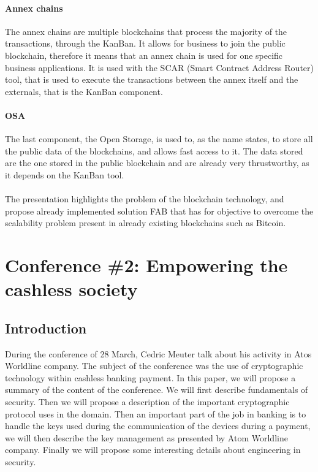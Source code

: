 \documentclass[11pt,a4paper]{article}
\begin{document}
\paragraph{Annex chains}

The annex chains are multiple blockchains that process the majority
of the transactions, through the KanBan. It allows for
business to join the public blockchain, therefore it means that
an annex chain is used for one specific business applications.
It is used with the SCAR (Smart Contract Address Router) tool, that is
used to execute the transactions between the annex itself
and the externals, that is the KanBan component.

\paragraph{OSA}

The last component, the Open Storage, is used to, as the name states, to
store all the public data of the blockchains, and allows fast access
to it. The data stored are the one stored in the public blockchain
and are already very thrustworthy, as it depends on the KanBan tool.

\paragraph{}

The presentation highlights the problem of the blockchain technology,
and propose already implemented solution FAB that has for objective
to overcome the scalability problem present in already existing blockchains
such as Bitcoin.

\newpage

\section{Conference \#2: Empowering the cashless society}

\subsection{Introduction}

During the conference of 28 March, Cedric Meuter
talk about his activity in Atos Worldline company.
The subject of the conference was the use of
cryptographic technology within cashless banking payment.
In this paper, we will propose a summary of the content of the
conference. We will first describe fundamentals of security.
Then we will propose a description of the important
cryptographic protocol uses in the domain. Then an important
part of the job in banking is to handle the keys used
during the communication of the devices during a payment,
we will then describe the key management as presented
by Atom Worldline company.
Finally we will propose some interesting details about
engineering in security.
\end{document}
